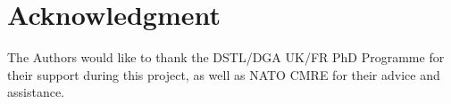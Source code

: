 \documentclass[conference,compsoc,letterpaper]{IEEEtran}
\begin{document}


\section*{Acknowledgment}

The Authors would like to thank the DSTL/DGA UK/FR PhD Programme for their support during this project, as well as NATO CMRE for their advice and assistance.




\end{document}
